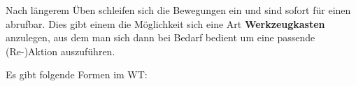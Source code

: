 Nach l\"angerem \"Uben schleifen sich die Bewegungen ein und sind sofort f\"ur einen abrufbar. Dies gibt einem die M\"oglichkeit sich eine Art \textbf{Werkzeugkasten} anzulegen, aus dem man sich dann bei Bedarf bedient um eine passende (Re-)Aktion auszuf\"uhren.






\begin{flushleft}
	Es gibt folgende Formen im WT:
\end{flushleft}

